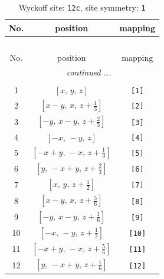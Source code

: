 \documentclass[fleqn,8pt]{jsarticle}
\begin{document}
\begin{longtable}{ccc}
\caption{Wyckoff site: {\tt 12c}, site symmetry: {\tt 1}}
 \\
 \hline \hline
No. & position & mapping \\ \hline \endfirsthead

\multicolumn{2}{l}{\tablename\ \thetable{}} \\
 \hline \hline
No. & position & mapping \\ \hline \endhead

 \hline \hline
\multicolumn{2}{r}{\footnotesize\it continued ...} \\ \endfoot

 \hline \hline
\multicolumn{2}{r}{} \\ \endlastfoot

1 & $\left[ x,\, y,\, z \right]$ & {\tt [1]} \\ \hline
2 & $\left[ x - y,\, x,\, z + \frac{1}{3} \right]$ & {\tt [2]} \\ \hline
3 & $\left[ - y,\, x - y,\, z + \frac{2}{3} \right]$ & {\tt [3]} \\ \hline
4 & $\left[ - x,\, - y,\, z \right]$ & {\tt [4]} \\ \hline
5 & $\left[ - x + y,\, - x,\, z + \frac{1}{3} \right]$ & {\tt [5]} \\ \hline
6 & $\left[ y,\, - x + y,\, z + \frac{2}{3} \right]$ & {\tt [6]} \\ \hline
7 & $\left[ x,\, y,\, z + \frac{1}{2} \right]$ & {\tt [7]} \\ \hline
8 & $\left[ x - y,\, x,\, z + \frac{5}{6} \right]$ & {\tt [8]} \\ \hline
9 & $\left[ - y,\, x - y,\, z + \frac{1}{6} \right]$ & {\tt [9]} \\ \hline
10 & $\left[ - x,\, - y,\, z + \frac{1}{2} \right]$ & {\tt [10]} \\ \hline
11 & $\left[ - x + y,\, - x,\, z + \frac{5}{6} \right]$ & {\tt [11]} \\ \hline
12 & $\left[ y,\, - x + y,\, z + \frac{1}{6} \right]$ & {\tt [12]} \\
\end{longtable}
\end{document}
